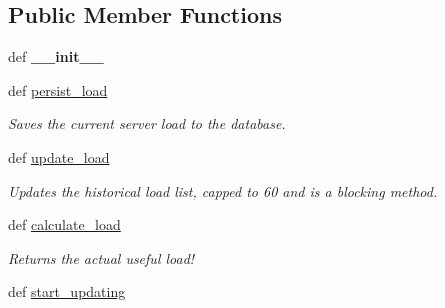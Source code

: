 \subsection*{Public Member Functions}
\begin{DoxyCompactItemize}
\item 
\hypertarget{classserver__load_1_1_server_load_aafc2d53d586363c7fe6a079137881710}{def {\bfseries \-\_\-\-\_\-init\-\_\-\-\_\-}}\label{classserver__load_1_1_server_load_aafc2d53d586363c7fe6a079137881710}

\item 
\hypertarget{classserver__load_1_1_server_load_acd4ebfbb9683857645e04954fe08134c}{def \hyperlink{classserver__load_1_1_server_load_acd4ebfbb9683857645e04954fe08134c}{persist\-\_\-load}}\label{classserver__load_1_1_server_load_acd4ebfbb9683857645e04954fe08134c}

\begin{DoxyCompactList}\small\item\em Saves the current server load to the database. \end{DoxyCompactList}\item 
\hypertarget{classserver__load_1_1_server_load_a75ed333bf4bb28ecc70a4f7f1f8ee335}{def \hyperlink{classserver__load_1_1_server_load_a75ed333bf4bb28ecc70a4f7f1f8ee335}{update\-\_\-load}}\label{classserver__load_1_1_server_load_a75ed333bf4bb28ecc70a4f7f1f8ee335}

\begin{DoxyCompactList}\small\item\em Updates the historical load list, capped to 60 and is a blocking method. \end{DoxyCompactList}\item 
\hypertarget{classserver__load_1_1_server_load_ab0c0ac1a48191a7cb144cec07127b0a1}{def \hyperlink{classserver__load_1_1_server_load_ab0c0ac1a48191a7cb144cec07127b0a1}{calculate\-\_\-load}}\label{classserver__load_1_1_server_load_ab0c0ac1a48191a7cb144cec07127b0a1}

\begin{DoxyCompactList}\small\item\em Returns the actual useful load! \end{DoxyCompactList}\item 
\hypertarget{classserver__load_1_1_server_load_a455c7fce4e73b4aec74cf6ae2fe265a2}{def \hyperlink{classserver__load_1_1_server_load_a455c7fce4e73b4aec74cf6ae2fe265a2}{start\-\_\-updating}}\label{classserver__load_1_1_server_load_a455c7fce4e73b4aec74cf6ae2fe265a2}


\end{DoxyCompactItemize}
